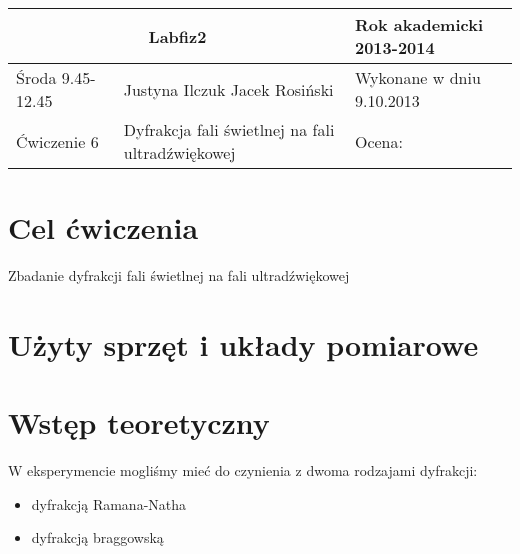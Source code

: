 \documentclass[a4paper,11pt]{article}
\author{Justyna Ilczuk, Jacek Rosiński}
\begin{document}
\begin{center}

    \begin{tabular}{ | m{5cm}| m{5cm} | m{5cm} |}
    \hline 
    \multicolumn{2}{|c|}{Labfiz2}
    & Rok akademicki 2013-2014 \\ 
    
    \hline
    Środa 9.45-12.45
    & Justyna Ilczuk \newline Jacek Rosiński
    & Wykonane w dniu 9.10.2013 \\
   	
   	\hline
   	Ćwiczenie 6 &  Dyfrakcja fali świetlnej na fali ultradźwiękowej &    Ocena: \\
   	\hline
    \end{tabular}
\end{center}

\pagestyle{fancy}
\fancyfoot[CO]{\ }
\fancyhead[RO]{\footnotesize{\thepage} }


\section{Cel ćwiczenia}

Zbadanie dyfrakcji fali świetlnej na fali ultradźwiękowej

\section{Użyty sprzęt i układy pomiarowe}


\section{Wstęp teoretyczny}



W eksperymencie mogliśmy mieć do czynienia z dwoma rodzajami dyfrakcji:
\begin{itemize}
\item dyfrakcją Ramana-Natha
\item dyfrakcją braggowską
\end{itemize}
\end{document}
